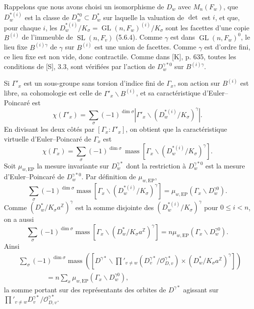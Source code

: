 \documentclass[10pt]{article}
\newcommand{\Z}{\mathbb Z}
\newcommand{\GL}{\operatorname{GL}}
\newcommand{\SL}{\operatorname{SL}}
\newcommand{\mass}{\operatorname{mass}}
\theoremstyle{deligne}
\newcommand{\heading}[1]{\vspace{0.7em}\noindent{\bfseries #1}\quad}
\begin{document}
\heading{5.15.} Rappelons que nous avons choisi un isomorphisme de $D_w$ avec $M_n(F_w)$, que $D_w^{*(i)}$ est la classe de $D_w^{*0}\subset D_w^*$ sur laquelle la valuation de $\det$ est $i$, et que, pour chaque $i$, les $D_w^{*(i)}/K_\sigma=\GL(n,F_w)^{(i)}/K_\sigma$ sont les facettes d'une copie $B^{(i)}$ de l'immeuble de $\SL(n,F_v)$ (5.6.4). Comme $\gamma$ est dans $\GL(n,F_w)^0$, le lieu fixe $B^{(i)\gamma}$ de $\gamma$ sur $B^{(i)}$ est une union de facettes. Comme $\gamma$ est d'ordre fini, ce lieu fixe est non vide, donc contractile. Comme dans [K], p. 635, toutes les conditions de [S], 3.3, sont vérifiées par l'action de $D_w^{\gamma *0}$ sur $B^{(i)\gamma}$.

Si $\Gamma'_x$ est un sous-groupe sans torsion d'indice fini de $\Gamma_x$, son action sur $B^{(i)}$ est libre, sa cohomologie est celle de $\Gamma'_x\backslash B^{(i)}$, et sa caractéristique d'Euler--Poincaré est
\[
\chi(\Gamma'_x)=\sum_\sigma(-1)^{\dim\sigma}\left|\Gamma'_x\backslash(D_w^{*(i)}/K_\sigma)^\gamma\right|.
\]
En divisant les deux côtés par $[\Gamma_x:\Gamma'_x]$, on obtient que la caractéristique virtuelle d'Euler--Poincaré de $\Gamma_x$ est
\begin{equation}\tag{5.15.1}
\chi(\Gamma_x)=\sum_\sigma(-1)^{\dim\sigma}\,
\mass[\Gamma_x\backslash(D_w^{*(i)}/K_\sigma)^\gamma].
\end{equation}
Soit $\mu_{w,\mathrm{EP}}$ la mesure invariante sur $D_w^{\gamma *}$ dont la restriction à $D_w^{\gamma *0}$ est la mesure d'Euler--Poincaré de $D_w^{\gamma *0}$. Par définition de $\mu_{w,\mathrm{EP}}$,
\[
\sum_\sigma(-1)^{\dim\sigma}\mass[\Gamma_x\backslash(D_w^{*(i)}/K_\sigma)^\gamma]
=\mu_{w,\mathrm{EP}}(\Gamma_x\backslash D_w^{\gamma 0}).
\]
Comme $(D_w^*/K_\sigma a^\Z)^\gamma$ est la somme disjointe des $(D_w^{*(i)}/K_\sigma)^\gamma$ pour $0\le i<n$, on a aussi
\[
\sum_\sigma(-1)^{\dim\sigma}\mass[\Gamma_x\backslash(D_w^*/K_\sigma a^\Z)^\gamma]
=n\mu_{w,\mathrm{EP}}(\Gamma_x\backslash D_w^{\gamma 0}).
\]
Ainsi
\begin{equation}\tag{5.15.2}
\begin{aligned}
&\sum_\sigma(-1)^{\dim\sigma}\mass\left([D^{\gamma *}\backslash
\prod'_{v\ne w}(D_v^{\gamma *}/\mathcal O_{D,v}^{\gamma *})\times(D_w^*/K_\sigma a^\Z)^\gamma]\right)\\
&\hspace{4em}=n\sum_x \mu_{w,\mathrm{EP}}(\Gamma_x\backslash D_w^{\gamma 0}),
\end{aligned}
\end{equation}
la somme portant sur des représentants des orbites de $D^{\gamma *}$ agissant sur $\prod'_{v\ne w}D_v^{\gamma *}/\mathcal O_{D,v}^{\gamma *}$.
\end{document}
